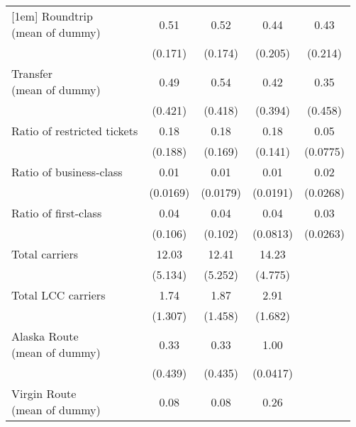 \begin{table}[htbp]
\begin{tabular}{l*{4}{c}}
[1em]
\Centerstack{Roundtrip \\ (mean of dummy)}&        0.51         &        0.52         &        0.44         &        0.43         \\
            &     (0.171)         &     (0.174)         &     (0.205)         &     (0.214)         \\
[1em]
\Centerstack{Transfer \\ (mean of dummy)}&        0.49         &        0.54         &        0.42         &        0.35         \\
            &     (0.421)         &     (0.418)         &     (0.394)         &     (0.458)         \\
[1em]
Ratio of restricted tickets&        0.18         &        0.18         &        0.18         &        0.05         \\
            &     (0.188)         &     (0.169)         &     (0.141)         &    (0.0775)         \\
[1em]
Ratio of business-class&        0.01         &        0.01         &        0.01         &        0.02         \\
            &    (0.0169)         &    (0.0179)         &    (0.0191)         &    (0.0268)         \\
[1em]
Ratio of first-class&        0.04         &        0.04         &        0.04         &        0.03         \\
            &     (0.106)         &     (0.102)         &    (0.0813)         &    (0.0263)         \\
[1em]
Total carriers&       12.03         &       12.41         &       14.23         &                     \\
            &     (5.134)         &     (5.252)         &     (4.775)         &                     \\
[1em]
Total LCC carriers&        1.74         &        1.87         &        2.91         &                     \\
            &     (1.307)         &     (1.458)         &     (1.682)         &                     \\
[1em]
\Centerstack{Alaska Route \\ (mean of dummy)}&        0.33         &        0.33         &        1.00         &                     \\
            &     (0.439)         &     (0.435)         &    (0.0417)         &                     \\
[1em]
\Centerstack{Virgin Route \\ (mean of dummy)}&        0.08         &        0.08         &        0.26         &                     \\

\end{tabular}
\end{table}
